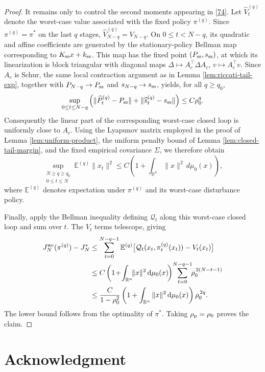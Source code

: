 \documentclass[10pt,journal,twoside]{IEEEtran}
\theoremstyle{definition}
\theoremstyle{remark}
\newcommand{\dd}{\mathrm{d}}
\begin{document}
\begin{proof}
	It remains only to control the second moments appearing in \eqref{74}.
	Let $\widehat V_t^{(q)}$ denote the worst-case value associated with
	the fixed policy $\pi^{(q)}$. Since $\pi^{(q)}=\pi^\ast$ on the last
	$q$ stages,
	$\widehat V_{N-q}^{(q)}=V_{N-q}$.
	On $0\le t<N-q$, its quadratic and affine coefficients are generated
	by the stationary-policy Bellman map corresponding to
	$K_{\rm ss}x+k_{\rm ss}$. This map has the fixed point
	$(P_{\rm ss},s_{\rm ss})$, at which its linearization is block triangular with diagonal maps
	$\Delta\mapsto A_c^\top\Delta A_c$, $v\mapsto A_c^\top v$.
	Since $A_c$ is Schur, the same local contraction argument as in
	Lemma \ref{lem:riccati-tail-exp}, together with
	$P_{N-q}\to P_{\rm ss}$ and $s_{N-q}\to s_{\rm ss}$, yields, for all
	$q\ge q_0$,
	\[
	\sup_{0\le t\le N-q}
	\left(
	\|\widehat P_t^{(q)}-P_{\rm ss}\|
	+\|\widehat s_t^{(q)}-s_{\rm ss}\|
	\right)
	\le C\rho_0^q.
	\]
	Consequently the linear part of the corresponding worst-case closed loop is uniformly close to $A_c$. Using the Lyapunov matrix	employed in the proof of Lemma \ref{lem:uniform-product}, the uniform penalty bound of Lemma \ref{lem:closed-tail-margin}, and the fixed empirical covariance $\Sigma$, we therefore
	obtain
	\[
	\sup_{\substack{N\ge q\ge q_0\\0\le t\le N}}
	\mathbb{E}^{(q)}\|x_t\|^2
	\le
	C
	\left(1+\int_{\mathbb{R}^n}\|x\|^2\,d\mu_0(x)\right),
	\]
	where $\mathbb{E}^{(q)}$ denotes expectation under
	$\pi^{(q)}$ and its worst-case disturbance policy.
	
	Finally, apply the Bellman inequality defining $\mathcal{Q}_t$ along
	this worst-case closed loop and sum over $t$. The $V_t$ terms
	telescope, giving
	\[
	\begin{aligned}
		J_N^{\rm wc}(\pi^{(q)})-J_N^\ast
		&\le
		\sum_{t=0}^{N-q-1}
		\mathbb{E}^{(q)}
		\big[
		\mathcal{Q}_t(x_t,\pi_t^{(q)}(x_t))-V_t(x_t)
		\big] \\
		&\le
		C\left(1\!+\!\int_{\mathbb{R}^n}\!\!\|x\|^2\,\dd\mu_0(x)\!\right)\!
		\sum_{t=0}^{N-q-1}\!\!\rho_0^{\,2(N-t-1)} \\
		&\le
		\frac{C}{1-\rho_0^2}
		\left(1+\int_{\mathbb{R}^n}\|x\|^2\,\dd\mu_0(x)\right)
		\rho_0^{\,2q}.
	\end{aligned}
	\]
	The lower bound follows from the optimality of $\pi^\ast$.
	Taking $\rho_{\rm p}=\rho_0$ proves the claim.
\end{proof}



\section*{Acknowledgment}
\end{document}
